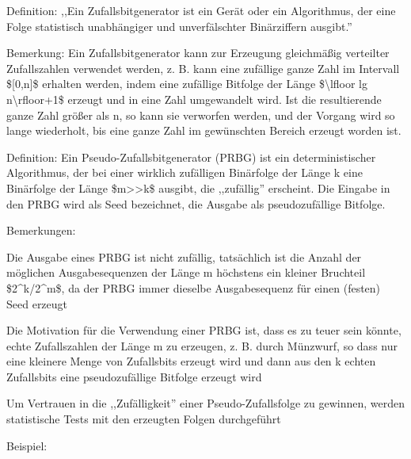 \documentclass[a4paper]{article}
\begin{document}
\begin{multicols}{3}
      \begin{itemize*}
            \item Definition: ,,Ein Zufallsbitgenerator ist ein Gerät oder ein
            Algorithmus, der eine Folge statistisch unabhängiger und
            unverfälschter Binärziffern ausgibt.''
            \item Bemerkung: Ein Zufallsbitgenerator kann zur Erzeugung gleichmäßig
            verteilter Zufallszahlen verwendet werden, z. B. kann eine zufällige
            ganze Zahl im Intervall \${[}0,n{]}\$ erhalten werden, indem eine
            zufällige Bitfolge der Länge \$\textbackslash lfloor lg
            n\textbackslash rfloor+1\$ erzeugt und in eine Zahl umgewandelt wird.
            Ist die resultierende ganze Zahl größer als n, so kann sie verworfen
            werden, und der Vorgang wird so lange wiederholt, bis eine ganze Zahl
            im gewünschten Bereich erzeugt worden ist.
            \item Definition: Ein Pseudo-Zufallsbitgenerator (PRBG) ist ein
            deterministischer Algorithmus, der bei einer wirklich zufälligen
            Binärfolge der Länge k eine Binärfolge der Länge
            \$m\textgreater\textgreater k\$ ausgibt, die ,,zufällig'' erscheint.
            Die Eingabe in den PRBG wird als Seed bezeichnet, die Ausgabe als
            pseudozufällige Bitfolge.
            \item Bemerkungen:
            \begin{itemize*}
                  \item Die Ausgabe eines PRBG ist nicht zufällig, tatsächlich ist die Anzahl der möglichen Ausgabesequenzen der Länge m höchstens ein kleiner Bruchteil \$2\^{}k/2\^{}m\$, da der PRBG immer dieselbe Ausgabesequenz für einen (festen) Seed erzeugt
                  \item Die Motivation für die Verwendung einer PRBG ist, dass es zu teuer sein könnte, echte Zufallszahlen der Länge m zu erzeugen, z. B. durch Münzwurf, so dass nur eine kleinere Menge von Zufallsbits erzeugt wird und dann aus den k echten Zufallsbits eine pseudozufällige Bitfolge erzeugt wird
                  \item Um Vertrauen in die ,,Zufälligkeit'' einer Pseudo-Zufallsfolge zu gewinnen, werden statistische Tests mit den erzeugten Folgen durchgeführt
            \end{itemize*}
            \item Beispiel:
            \begin{itemize*}

\end{itemize*}
\end{itemize*}
\end{multicols}
\end{document}
